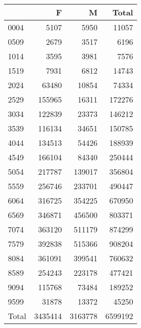 \begin{table}[h!]
  \centering
  \begin{tabular}{|l|rrr|}
    \hline
    & F & M & Total\\
    \hline
    0004  & 5107 & 5950 & 11057\\
    0509  & 2679 & 3517 & 6196\\
    1014  & 3595 & 3981 & 7576\\
    1519  & 7931 & 6812 & 14743\\
    2024  & 63480 & 10854 & 74334\\
    2529  & 155965 & 16311 & 172276\\
    3034  & 122839 & 23373 & 146212\\
    3539  & 116134 & 34651 & 150785\\
    4044  & 134513 & 54426 & 188939\\
    4549  & 166104 & 84340 & 250444\\
    5054  & 217787 & 139017 & 356804\\
    5559  & 256746 & 233701 & 490447\\
    6064  & 316725 & 354225 & 670950\\
    6569  & 346871 & 456500 & 803371\\
    7074  & 363120 & 511179 & 874299\\
    7579  & 392838 & 515366 & 908204\\
    8084  & 361091 & 399541 & 760632\\
    8589  & 254243 & 223178 & 477421\\
    9094  & 115768 & 73484 & 189252\\
    9599  & 31878 & 13372 & 45250\\
    Total  & 3435414 & 3163778 & 6599192\\
    \hline
  \end{tabular}
\end{table}
